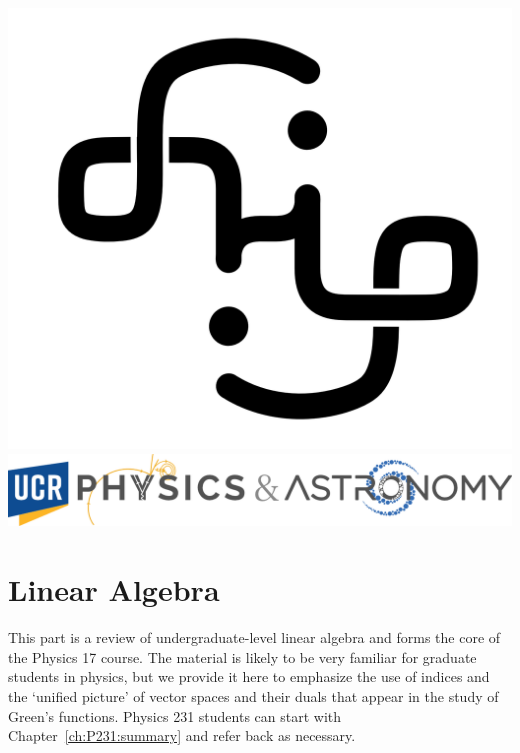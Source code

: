 \documentclass[12pt, oneside]{report}
\begin{document}
\noindent %

\vspace*{\fill}
\begin{center}
\includegraphics[height=.1\textwidth]{figures/FlipAmbigram.png}
\hspace{5em}
\includegraphics[height=.1\textwidth]{figures/UCRPnA_banner.png}
\end{center}

\newpage

\small
\setcounter{tocdepth}{2}
\tableofcontents
\normalsize
\clearpage
\restoregeometry        %








\part{Linear Algebra}

This part is a review of undergraduate-level linear algebra and forms the core of the Physics 17 course. The material is likely to be very familiar for graduate students in physics, but we provide it here to emphasize the use of indices and the `unified picture' of vector spaces and their duals that appear in the study of Green's functions. Physics 231 students can start with Chapter~\eqref{ch:P231:summary} and refer back as necessary.
















\end{document}

